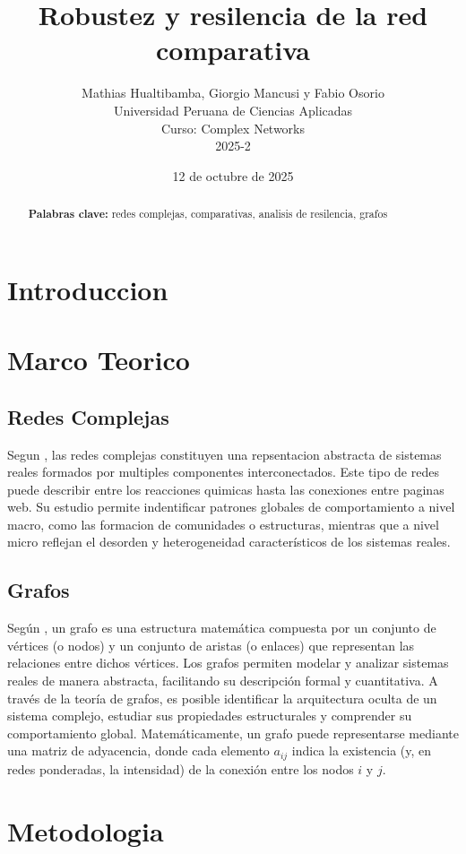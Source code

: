 \documentclass[twocolumn]{article}
\title{Robustez y resilencia de la red comparativa}
\author{
    Mathias Hualtibamba, Giorgio Mancusi y Fabio Osorio \\
    Universidad Peruana de Ciencias Aplicadas \\
    Curso: Complex Networks \\
    2025-2 
}
\date{12 de octubre de 2025}
\newcommand{\keywords}[1]{\par\noindent\textbf{Palabras clave:} #1}
\begin{document}
\maketitle

\begin{abstract}
\blindtext[1]
\keywords{redes complejas, comparativas, analisis de resilencia, grafos}
\end{abstract}

\section{Introduccion}
\blindtext[2]

\section{Marco Teorico}
\subsection{Redes Complejas}
Segun \cite{ding2025comprehensivesurveyartificialintelligence}, las redes complejas constituyen una repsentacion abstracta de sistemas reales formados por multiples componentes interconectados. 
Este tipo de redes puede describir entre los reacciones quimicas hasta las conexiones entre paginas web. Su estudio permite indentificar patrones globales de comportamiento a nivel macro, como las formacion de comunidades o estructuras, mientras que a nivel micro reflejan el desorden y heterogeneidad característicos de los sistemas reales.

\subsection{Grafos}
Según \textcite{Zamora_L_pez_2024}, un grafo es una estructura matemática compuesta por un conjunto de vértices (o nodos) y un conjunto de aristas (o enlaces) que representan las relaciones entre dichos vértices. 
Los grafos permiten modelar y analizar sistemas reales de manera abstracta, facilitando su descripción formal y cuantitativa. 
A través de la teoría de grafos, es posible identificar la arquitectura oculta de un sistema complejo, estudiar sus propiedades estructurales y comprender su comportamiento global. 
Matemáticamente, un grafo puede representarse mediante una matriz de adyacencia, donde cada elemento $a_{ij}$ indica la existencia (y, en redes ponderadas, la intensidad) de la conexión entre los nodos $i$ y $j$.


\section{Metodologia}
\blindtext[3]
\end{document}
